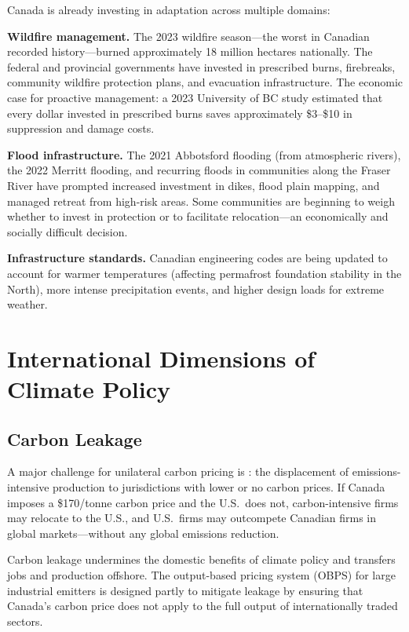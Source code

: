 Canada is already investing in adaptation across multiple domains:

\textbf{Wildfire management.} The 2023 wildfire season---the worst in Canadian recorded history---burned approximately 18 million hectares nationally. The federal and provincial governments have invested in prescribed burns, firebreaks, community wildfire protection plans, and evacuation infrastructure. The economic case for proactive management: a 2023 University of BC study estimated that every dollar invested in prescribed burns saves approximately \$3--\$10 in suppression and damage costs.

\textbf{Flood infrastructure.} The 2021 Abbotsford flooding (from atmospheric rivers), the 2022 Merritt flooding, and recurring floods in communities along the Fraser River have prompted increased investment in dikes, flood plain mapping, and managed retreat from high-risk areas. Some communities are beginning to weigh whether to invest in protection or to facilitate relocation---an economically and socially difficult decision.

\textbf{Infrastructure standards.} Canadian engineering codes are being updated to account for warmer temperatures (affecting permafrost foundation stability in the North), more intense precipitation events, and higher design loads for extreme weather.

\section{International Dimensions of Climate Policy}

\subsection{Carbon Leakage}

A major challenge for unilateral carbon pricing is : the displacement of emissions-intensive production to jurisdictions with lower or no carbon prices. If Canada imposes a \$170/tonne carbon price and the U.S.\ does not, carbon-intensive firms may relocate to the U.S., and U.S.\ firms may outcompete Canadian firms in global markets---without any global emissions reduction.

Carbon leakage undermines the domestic benefits of climate policy and transfers jobs and production offshore. The output-based pricing system (OBPS) for large industrial emitters is designed partly to mitigate leakage by ensuring that Canada's carbon price does not apply to the full output of internationally traded sectors.

